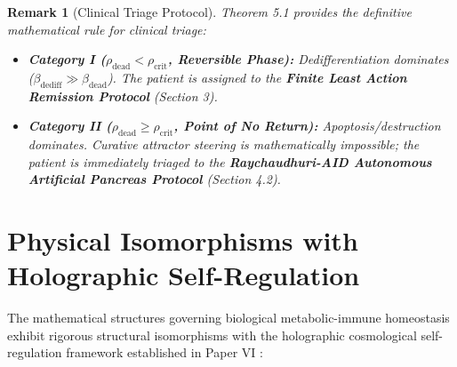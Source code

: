 \documentclass[11pt,a4paper]{article}
\newtheorem{remark}[theorem]{Remark}
\begin{document}
\begin{remark}[Clinical Triage Protocol]
Theorem 5.1 provides the definitive mathematical rule for clinical triage:
\begin{itemize}
    \item \textbf{Category I ($\rho_{\mathrm{dead}} < \rho_{\mathrm{crit}}$, Reversible Phase):} Dedifferentiation dominates ($\beta_{\mathrm{dediff}} \gg \beta_{\mathrm{dead}}$). The patient is assigned to the \textbf{Finite Least Action Remission Protocol} (Section 3).
    \item \textbf{Category II ($\rho_{\mathrm{dead}} \ge \rho_{\mathrm{crit}}$, Point of No Return):} Apoptosis/destruction dominates. Curative attractor steering is mathematically impossible; the patient is immediately triaged to the \textbf{Raychaudhuri-AID Autonomous Artificial Pancreas Protocol} (Section 4.2).
\end{itemize}
\end{remark}

\section{Physical Isomorphisms with Holographic Self-Regulation}

The mathematical structures governing biological metabolic-immune homeostasis exhibit rigorous structural isomorphisms with the holographic cosmological self-regulation framework established in Paper VI \cite{Yoshikai2026f}:
\end{document}
